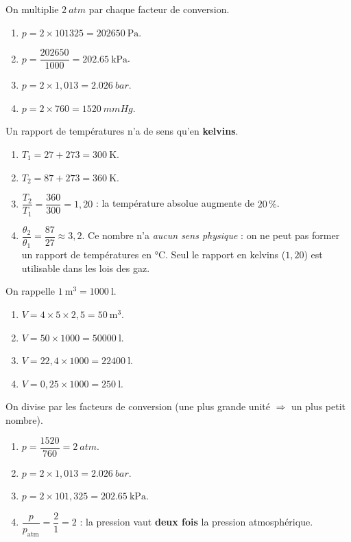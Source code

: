 \documentclass[11pt,a4paper]{article}
\begin{document}
\begin{corrige}
On multiplie $\qty{2}{atm}$ par chaque facteur de conversion.
\begin{enumerate}[label=\alph*)]
  \item $p=2\times101325=\qty{202650}{\pascal}$.
  \item $p=\dfrac{202650}{1000}=\qty{202.65}{\kilo\pascal}$.
  \item $p=2\times1{,}013=\qty{2.026}{bar}$.
  \item $p=2\times760=\qty{1520}{mmHg}$.
\end{enumerate}
\end{corrige}

\begin{corrige}
Un rapport de températures n'a de sens qu'en \textbf{kelvins}.
\begin{enumerate}[label=\alph*)]
  \item $T_1=27+273=\qty{300}{\kelvin}$.
  \item $T_2=87+273=\qty{360}{\kelvin}$.
  \item $\dfrac{T_2}{T_1}=\dfrac{360}{300}=1{,}20$ : la température absolue augmente de $20\,\%$.
  \item $\dfrac{\theta_2}{\theta_1}=\dfrac{87}{27}\approx3{,}2$. Ce nombre n'a \emph{aucun sens physique} :
        on ne peut pas former un rapport de températures en \si{\degreeCelsius}. Seul le rapport en
        kelvins ($1{,}20$) est utilisable dans les lois des gaz.
\end{enumerate}
\end{corrige}

\begin{corrige}
On rappelle $\qty{1}{\meter\cubed}=\qty{1000}{\litre}$.
\begin{enumerate}[label=\alph*)]
  \item $V=4\times5\times2{,}5=\qty{50}{\meter\cubed}$.
  \item $V=50\times1000=\qty{50000}{\litre}$.
  \item $V=22{,}4\times1000=\qty{22400}{\litre}$.
  \item $V=0{,}25\times1000=\qty{250}{\litre}$.
\end{enumerate}
\end{corrige}

\begin{corrige}
On divise par les facteurs de conversion (une plus grande unité $\Rightarrow$ un plus petit nombre).
\begin{enumerate}[label=\alph*)]
  \item $p=\dfrac{1520}{760}=\qty{2}{atm}$.
  \item $p=2\times1{,}013=\qty{2.026}{bar}$.
  \item $p=2\times101{,}325=\qty{202.65}{\kilo\pascal}$.
  \item $\dfrac{p}{p_{\text{atm}}}=\dfrac{2}{1}=2$ : la pression vaut \textbf{deux fois} la pression
        atmosphérique.
\end{enumerate}
\end{corrige}
\end{document}
